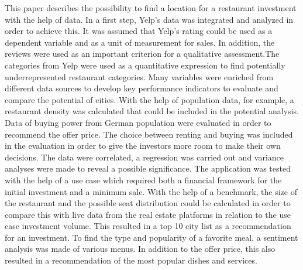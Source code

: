 This paper describes the possibility to find a location for a restaurant investment with the help of data. 
In a first step, Yelp's data was integrated and analyzed in order to achieve this. It was assumed that Yelp's rating could be used as a dependent variable and as a unit of measurement for sales. In addition, the reviews were used as an important criterion for a qualitative assessment.The categories from Yelp were used as a quantitative expression to find potentially underrepresented restaurant categories. \newline
Many variables were enriched from different data sources to develop key performance indicators to evaluate and compare the potential of cities. \newline 
With the help of population data, for example, a restaurant density was calculated that could be included in the potential analysis.
Data of buying power from German population were evaluated in order to recommend the offer price.
The choice between renting and buying was included in the evaluation in order to give the investors more room to make their own decisions. \newline 
The data were correlated, a regression was carried out and variance analyses were made to reveal a possible significance. 
The application was tested with the help of a use case which required both a financial framework for the initial investment and a minimum sale.  \newline
With the help of a benchmark, the size of the restaurant and the possible seat distribution could be calculated in order to compare this with live data from the real estate platforms in relation to the use case investment volume.
This resulted in a top 10 city list as a recommendation for an investment. 
To find the type and popularity of a favorite meal, a sentiment analysis was made of various menus. In addition to the offer price, this also resulted in a recommendation of the most popular dishes and services. 

%
%
